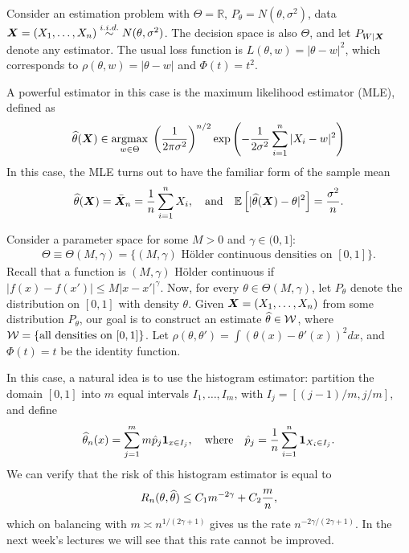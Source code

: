 \documentclass[12pt]{article}
\begin{document}
	\begin{example}
		\label{example:estimation-GLM} Consider an estimation problem with $\Theta = \mathbb{R}$, $P_\theta = N(\theta, \sigma^2)$, data  ${\boldsymbol X} = (X_1, \ldots, X_n)  \stackrel{i.i.d.}{\sim}  N(\theta, \sigma^2)$. The decision space is also $\Theta$, and let $P_{W|{\boldsymbol X}}$ denote any estimator. The usual loss function is $L(\theta, w) = |\theta - w|^2$, which corresponds to $\rho(\theta, w) = |\theta-w|$ and $\Phi(t) = t^2$. 

		A powerful estimator in this case is the maximum likelihood estimator (MLE), defined as 
		\begin{align}
		\widehat{\theta}({\boldsymbol X}) \in \operatorname*{argmax}_{w \in \Theta} \; \left( \frac{1}{2 \pi \sigma^2} \right)^{n/2} \exp \left( - \frac{1}{2 \sigma^2} \sum_{i=1}^n |X_i - w|^2 \right)
		\end{align}
		In this case, the MLE turns out to have the familiar form of the sample mean 
		\begin{align}
		\widehat{\theta}({\boldsymbol X}) = \bar{{\boldsymbol X}}_n = \frac{1}{n} \sum_{i=1}^n X_i, \quad \text{and} \quad \mathbb{E}\left[ |\widehat{\theta}({\boldsymbol X}) - \theta|^2 \right] = \frac{\sigma^2}{n}. 
		\end{align}
	\end{example}

	\begin{example}
		\label{example:density-estimation} Consider a parameter space  for some $M>0$ and $\gamma \in (0, 1]$: 
		\begin{align}
		\Theta \equiv \Theta(M, \gamma) = \{ (M, \gamma) \text{ H\"older continuous densities on } [0,1] \}. 
		\end{align}
		Recall that a function is $(M, \gamma)$ H\"older continuous if $|f(x)- f(x')| \leq M |x-x'|^{\gamma}$. Now, for every $\theta \in \Theta(M, \gamma)$, let $P_\theta$ denote the distribution on $[0,1]$ with density $\theta$. Given ${\boldsymbol X} = (X_1, \ldots, X_n)$ \iid from some distribution $P_\theta$, our goal is to construct an estimate $\widehat{\theta} \in {\cal W}$, where ${\cal W} = \{\text{all densities on }[0,1]\}$. Let $\rho(\theta, \theta') = \int (\theta(x) - \theta'(x))^2 dx$, and $\Phi(t) = t$ be the identity function. 

		In this case, a natural idea is to use the histogram estimator: partition the domain $[0,1]$ into $m$ equal intervals $I_1, \ldots, I_{m}$, with $I_j = [(j-1)/m, j/m]$, and define 
		\begin{align}
		\widehat{\theta}_n(x) = \sum_{j=1}^m m \hat{p}_j \boldsymbol{1}_{x \in I_j}, \quad \text{where} \quad \hat{p}_j = \frac{1}{n} \sum_{i=1}^n \boldsymbol{1}_{X_i \in I_j}. 
		\end{align}
		We can verify that the risk of this histogram estimator is equal to 
		\begin{align}
		R_n(\theta, \widehat{\theta}) \leq C_1m^{-2\gamma} + C_2\frac{m}{n}, 
		\end{align}
		which on balancing with $m \asymp n^{1/(2\gamma + 1)}$ gives us the rate $n^{-2\gamma/(2\gamma + 1)}$.  In the next week's lectures we will see that this rate cannot be improved. 
	\end{example}
\end{document}
